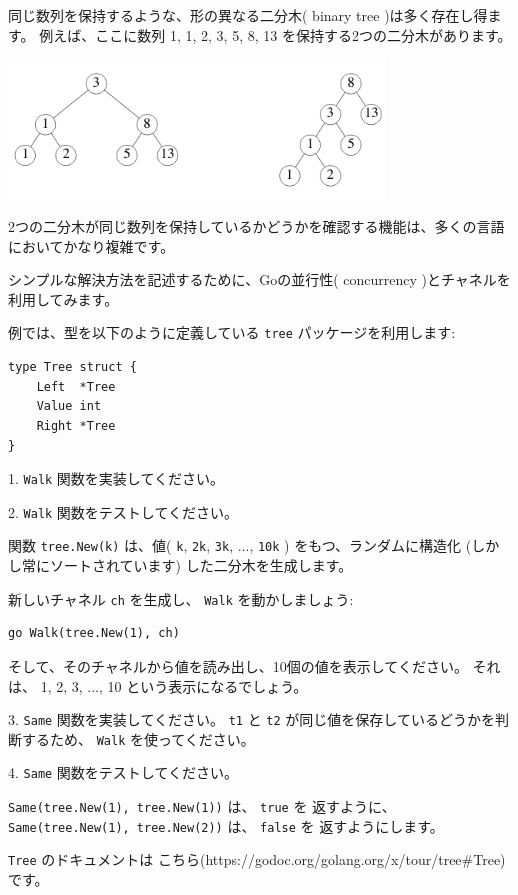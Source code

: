 同じ数列を保持するような、形の異なる二分木( binary tree )は多く存在し得ます。
例えば、ここに数列 1, 1, 2, 3, 5, 8, 13 を保持する2つの二分木があります。

\includegraphics[width=10cm]{tree.png}

2つの二分木が同じ数列を保持しているかどうかを確認する機能は、多くの言語においてかなり複雑です。

シンプルな解決方法を記述するために、Goの並行性( concurrency )とチャネルを利用してみます。

例では、型を以下のように定義している \texttt{tree} パッケージを利用します:

\begin{lstlisting}[numbers=none]
type Tree struct {
    Left  *Tree
    Value int
    Right *Tree
}
\end{lstlisting}

1. \texttt{Walk} 関数を実装してください。

2. \texttt{Walk} 関数をテストしてください。

関数 \texttt{tree.New(k)} は、値( \texttt{k}, \texttt{2k}, \texttt{3k}, ..., \texttt{10k} )
をもつ、ランダムに構造化 (しかし常にソートされています) した二分木を生成します。

新しいチャネル \texttt{ch} を生成し、 \texttt{Walk} を動かしましょう:

\begin{lstlisting}[numbers=none]
go Walk(tree.New(1), ch)
\end{lstlisting}

そして、そのチャネルから値を読み出し、10個の値を表示してください。 それは、 1, 2, 3, ..., 10 という表示になるでしょう。

3. \texttt{Same} 関数を実装してください。 \texttt{t1} と \texttt{t2}
が同じ値を保存しているどうかを判断するため、 \texttt{Walk} を使ってください。

4. \texttt{Same} 関数をテストしてください。

\texttt{Same(tree.New(1), tree.New(1))} は、 \texttt{true} を
返すように、 \texttt{Same(tree.New(1), tree.New(2))} は、 \texttt{false} を
返すようにします。

\texttt{Tree} のドキュメントは
こちら(https:\//\//godoc.org\//golang.org\//x\//tour\//tree\#Tree) です。


